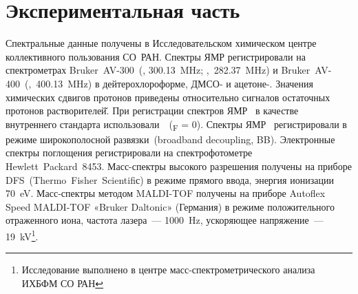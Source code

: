 \section{Экспериментальная часть}
Спектральные данные получены в Исследовательском химическом центре коллективного пользования СО~РАН.
Спектры ЯМР регистрировали на спектрометрах Bruker~AV-300~(, \SI{300.13}{\mega\hertz}; ,~\SI{282.37}{\mega\hertz}) и Bruker~AV-400~(,~\SI{400.13}{\mega\hertz}) в дейтерохлороформе, \mbox{ДМСО-} и \mbox{ацетоне-}.
Значения химических сдвигов протонов приведены относительно сигналов остаточных протонов растворителей̆.
При регистрации спектров ЯМР~ в качестве внутреннего стандарта использовали~~(\chemdelta{}\textsubscript{F} = \SI{0}{\ppm}).
Спектры ЯМР~ регистрировали в режиме широкополосной развязки~(broadband decoupling, BB).
Электронные спектры поглощения регистрировали на спектрофотометре Hewlett~Packard~8453.
Масс-спектры высокого разрешения получены на приборе DFS~(Thermo~Fisher~Scientifiс) в режиме прямого ввода, энергия ионизации \SI{70}{\electronvolt}.
Масс-спектры методом  MALDI-TOF получены на приборе Autoflex Speed MALDI-TOF «Bruker Daltonic» (Германия) в режиме положительного отраженного иона, частота лазера~–-- \SI{1000}{\hertz}, ускоряющее напряжение~–-- \SI{19}{\kilo\volt}\footnote{Исследование выполнено в центре масс-спектрометрического анализа ИХБФМ СО РАН}.

